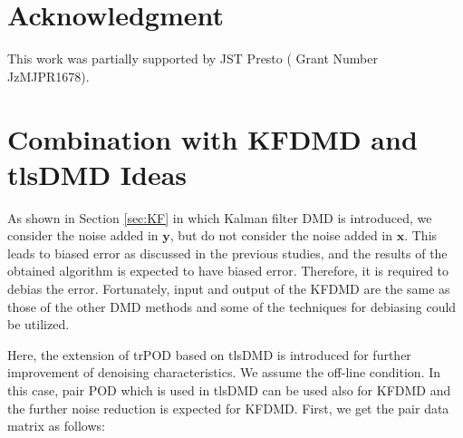 \documentclass[aip,graphicx]{revtex4-1}
\begin{document}
\section*{Acknowledgment}
This work was partially supported by JST Presto ( Grant Number JzMJPR1678). 

\appendix
\section{Combination with KFDMD and tlsDMD Ideas}
As shown in Section \ref{sec:KF} in which Kalman filter DMD is introduced, we consider the noise added in $\bm{y}$, but do not consider the noise added in $\bm{x}$. This leads to biased error as discussed in the previous studies, and the results of the obtained algorithm is expected to have biased error. Therefore, it is required to debias the error. Fortunately, input and output of the KFDMD are the same as those of the other DMD methods and some of the techniques for debiasing could be utilized. 

Here, the extension of trPOD based on tlsDMD is introduced for further improvement of denoising characteristics. We assume the off-line condition. In this case, pair POD which is used in tlsDMD can be used also for KFDMD and the further noise reduction is expected for KFDMD.  
First, we get the pair data matrix as follows:
\end{document}
